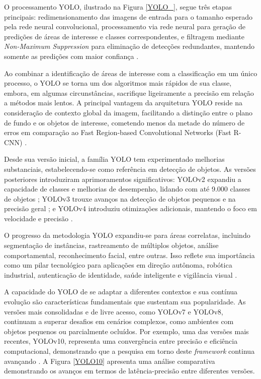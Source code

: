 O processamento YOLO, ilustrado na Figura \ref{YOLO_}, segue três etapas principais: redimensionamento das imagens de entrada para o tamanho esperado pela rede neural convolucional, processamento via rede neural para geração de predições de áreas de interesse e classes correspondentes, e filtragem mediante \textit{Non-Maximum Suppression} para eliminação de detecções redundantes, mantendo somente as predições com maior confiança \cite{redmon2016lookonceunifiedrealtime}.

Ao combinar a identificação de áreas de interesse com a classificação em um único processo, o YOLO se torna um dos algoritmos mais rápidos de sua classe, embora, em algumas circunstâncias, sacrifique ligeiramente a precisão em relação a métodos mais lentos. A principal vantagem da arquitetura YOLO reside na consideração de contexto global da imagem, facilitando a distinção entre o plano de fundo e os objetos de interesse, cometendo menos da metade do número de erros em comparação ao Fast Region-based Convolutional Networks (Fast R-CNN) \cite[p. ~2]{redmon2016lookonceunifiedrealtime}.

Desde sua versão inicial, a família YOLO tem experimentado melhorias substanciais, estabelecendo-se como referência em detecção de objetos. As versões posteriores introduziram aprimoramentos significativos: YOLOv2 expandiu a capacidade de classes e melhorias de desempenho, lidando com até 9.000 classes de objetos \cite{redmon2016yolo9000betterfasterstronger}; YOLOv3 trouxe avanços na detecção de objetos pequenos e na precisão geral \cite{redmon2018yolov3incrementalimprovement}; e YOLOv4 introduziu otimizações adicionais, mantendo o foco em velocidade e precisão \cite{bochkovskiy2020yolov4optimalspeedaccuracy}.

O progresso da metodologia YOLO expandiu-se para áreas correlatas, incluindo segmentação de instâncias, rastreamento de múltiplos objetos, análise comportamental, reconhecimento facial, entre outras. Isso reflete sua importância como um pilar tecnológico para aplicações em direção autônoma, robótica industrial, autenticação de identidade, saúde inteligente e vigilância visual \cite{wang_yolov1_to_yolov10}.

A capacidade do YOLO de se adaptar a diferentes contextos e sua contínua evolução são características fundamentais que sustentam sua popularidade. As versões mais consolidadas e de livre acesso, como YOLOv7 e YOLOv8, continuam a superar desafios em cenários complexos, como ambientes com objetos pequenos ou parcialmente ocluídos. Por exemplo, uma das versões mais recentes, YOLOv10, representa uma convergência entre precisão e eficiência computacional, demonstrando que a pesquisa em torno deste \textit{framework} continua avançando \cite{wang_yolov1_to_yolov10}. A Figura \ref{YOLO10} apresenta uma análise comparativa demonstrando os avanços em termos de latência-precisão entre diferentes versões.

